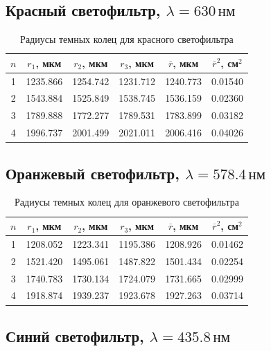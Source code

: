 \documentclass[12pt,a4paper]{article}
\newcommand{\nm}{\ensuremath{\,\text{нм}}}
\begin{document}
\subsection{Красный светофильтр, $\lambda = 630\nm$}

\begin{table}[H]
\centering
\small
\caption{Радиусы темных колец для красного светофильтра}
\begin{tabular}{cccccc}
\toprule
$n$ & $r_1$, мкм & $r_2$, мкм & $r_3$, мкм & $\overline r$, мкм & $\overline r^2$, см$^2$ \\
\midrule
1 & 1235.866 & 1254.742 & 1231.712 & 1240.773 & 0.01540 \\
2 & 1543.884 & 1525.849 & 1538.745 & 1536.159 & 0.02360 \\
3 & 1789.888 & 1772.277 & 1789.531 & 1783.899 & 0.03182 \\
4 & 1996.737 & 2001.499 & 2021.011 & 2006.416 & 0.04026 \\
\bottomrule
\end{tabular}
\end{table}

\subsection{Оранжевый светофильтр, $\lambda = 578.4\nm$}

\begin{table}[H]
\centering
\small
\caption{Радиусы темных колец для оранжевого светофильтра}
\begin{tabular}{cccccc}
\toprule
$n$ & $r_1$, мкм & $r_2$, мкм & $r_3$, мкм & $\overline r$, мкм & $\overline r^2$, см$^2$ \\
\midrule
1 & 1208.052 & 1223.341 & 1195.386 & 1208.926 & 0.01462 \\
2 & 1521.420 & 1495.061 & 1487.822 & 1501.434 & 0.02254 \\
3 & 1740.783 & 1730.134 & 1724.079 & 1731.665 & 0.02999 \\
4 & 1918.874 & 1939.237 & 1923.678 & 1927.263 & 0.03714 \\
\bottomrule
\end{tabular}
\end{table}

\subsection{Синий светофильтр, $\lambda = 435.8\nm$}
\end{document}
